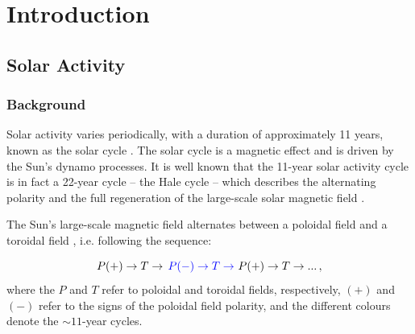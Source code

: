 \chapter{Introduction}\label{chap:intro}



\glsresetall 
{}
\section{Solar Activity}\label{sec:intro_activity}

\subsection{Background}

Solar activity varies periodically, with a duration of approximately 11 years, known as the solar cycle \citep{hathaway_solar_2015}. The solar cycle is a magnetic effect and is driven by the Sun's dynamo processes. It is well known that the 11-year solar activity cycle is in fact a 22-year cycle -- the Hale cycle -- which describes the alternating polarity and the full regeneration of the large-scale solar magnetic field \citep{hathaway_solar_2015, charbonneau_dynamo_2020}. 


The Sun's large-scale magnetic field alternates between a poloidal field and a toroidal field \citep{charbonneau_dynamo_2020}, i.e. following the sequence:

\begin{equation}
P(+) \rightarrow T \rightarrow \, \textcolor{blue}{P(-) \rightarrow T \rightarrow \,} \, P(+) \rightarrow T \rightarrow ... \, ,
\label{eq:solar_cycle_dynamo}
\end{equation}
%
where the $P$ and $T$ refer to poloidal and toroidal fields, respectively, $(+)$ and $(-)$ refer to the signs of the poloidal field polarity, and the different colours denote the $\sim11$-year cycles.

